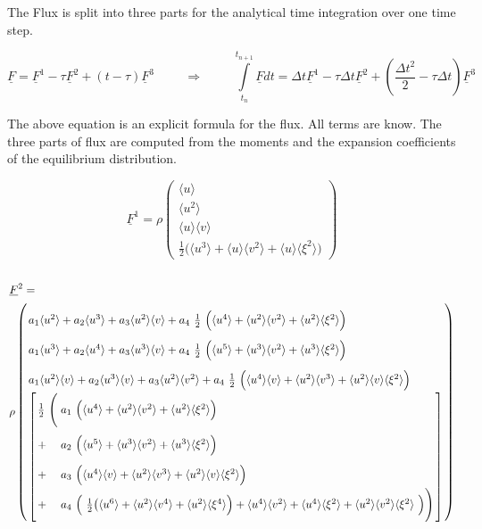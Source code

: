 \documentclass[
	pdftex,             %
	12pt,				%
	a4paper,		   	%
	english,				%
	oneside,			%
]{article}
\newcommand{\mom}[1]{\langle #1 \rangle}
\newcommand{\uu}[1]{\underline{#1}}
\begin{document}
The Flux is split into three parts for the analytical time integration over one time step. 

\begin{equation}
\uu{F} = \uu{F}^1 - \tau \uu{F}^2 + (t - \tau) \uu{F}^3
\hspace{1cm} \Rightarrow \hspace{1cm}
\int \limits_{t_n}^{t_{n+1}} \uu{F} dt 
= \Delta t\uu{F}^1 
- \tau \Delta t \uu{F}^2 
+ \left( \dfrac{\Delta t^2}{2} - \tau \Delta t \right) \uu{F}^3
\end{equation}

The above equation is an explicit formula for the flux. All terms are know. The three parts of flux are computed from the moments and the expansion coefficients of the equilibrium distribution.

\begin{equation}
\uu{F}^1 =
\rho
\begin{pmatrix}
\mom{u} \\ 
\mom{u^2} \\ 
\mom{u}\mom{v} \\ 
\frac{1}{2} \Big(\mom{u^3} + \mom{u}\mom{v^2} + \mom{u}\mom{\xi^2} \Big)
\end{pmatrix}
\end{equation}


\begin{equation}
\arraycolsep=1.4pt\def\arraystretch{2.2}
\begin{array}{l}
\uu{F}^2 
=
\\
\rho
\left(
\begin{array}{l}
    a_1 \mom{u^2} + 
    a_2 \mom{u^3} +
    a_3 \mom{u^2}\mom{v} +
    a_4 ~\tfrac{1}{2}~\Big( \mom{u^4} + \mom{u^2}\mom{v^2} + \mom{u^2}\mom{\xi^2} \Big)
\\
    a_1 \mom{u^3} +
    a_2 \mom{u^4} +
    a_3 \mom{u^3}\mom{v} +
    a_4 ~\tfrac{1}{2}~\Big( \mom{u^5} + \mom{u^3}\mom{v^2} + \mom{u^3}\mom{\xi^2} \Big)
\\
    a_1 \mom{u^2}\mom{v} +
    a_2 \mom{u^3}\mom{v} +
    a_3 \mom{u^2}\mom{v^2} +
    a_4 ~\tfrac{1}{2}~\Big( \mom{u^4}\mom{v} + \mom{u^2}\mom{v^3} + \mom{u^2}\mom{v}\mom{\xi^2} \Big)
\\
\left[
\begin{array}{ll}
\frac{1}{2} ~ \Bigg( 
   & a_1~ \Big( \mom{u^4} + \mom{u^2}\mom{v^2} + \mom{u^2}\mom{\xi^2} \Big) \\
 + & a_2~ \Big( \mom{u^5} + \mom{u^3}\mom{v^2} + \mom{u^3}\mom{\xi^2} \Big) \\
 + & a_3~ \Big( \mom{u^4}\mom{v} + \mom{u^2}\mom{v^3} + \mom{u^2}\mom{v}\mom{\xi^2} \Big) \\
 + & a_4~ \Big(~ \tfrac{1}{2} \big( \mom{u^6} + \mom{u^2}\mom{v^4} + \mom{u^2}\mom{\xi^4} \Big)
 				+ \mom{u^4}\mom{v^2} + \mom{u^4}\mom{\xi^2} + \mom{u^2}\mom{v^2}\mom{\xi^2} ~\Big)
\Bigg)
\end{array}
\right]
\end{array}
\right)
\end{array}
\end{equation}
\end{document}
